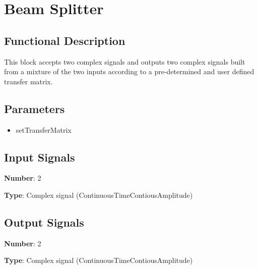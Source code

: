 \section{Beam Splitter}

\subsection*{Functional Description}

This block accepts two complex signals and outputs two complex signals built from a mixture of the two inputs according to a pre-determined and user defined transfer matrix.

\subsection*{Parameters}

\begin{multicols}{2}
	\begin{itemize}
		\item setTransferMatrix
	\end{itemize}
\end{multicols}


\subsection*{Input Signals}

\textbf{Number}: 2

\textbf{Type}: Complex signal (ContinuousTimeContiousAmplitude)

\subsection*{Output Signals}

\textbf{Number}: 2

\textbf{Type}: Complex signal (ContinuousTimeContiousAmplitude)